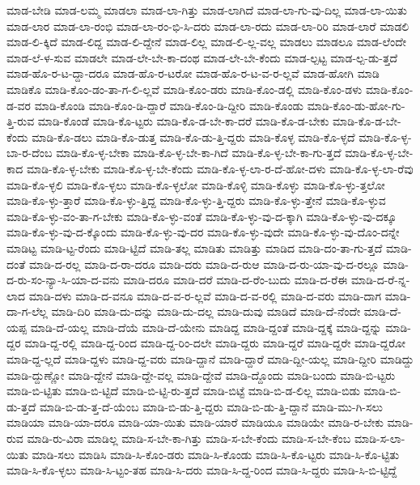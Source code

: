 {ಮಾಡ-ಬೇಡಿ
ಮಾಡ-ಲಮ್ಮ
ಮಾಡಲಾ
ಮಾಡ-ಲಾ-ಗಿತ್ತು
ಮಾಡ-ಲಾಗಿದೆ
ಮಾಡ-ಲಾ-ಗು-ವು-ದಿಲ್ಲ
ಮಾಡ-ಲಾ-ಯಿತು
ಮಾಡ-ಲಾರ
ಮಾಡ-ಲಾ-ರಂಭಿ
ಮಾಡ-ಲಾ-ರಂ-ಭಿ-ಸಿ-ದರು
ಮಾಡ-ಲಾ-ರದು
ಮಾಡ-ಲಾ-ರಿರಿ
ಮಾಡ-ಲಾರೆ
ಮಾಡಲಿ
ಮಾಡ-ಲಿ-ಕ್ಕಿದೆ
ಮಾಡ-ಲಿದ್ದ
ಮಾಡ-ಲಿ-ದ್ದೇನೆ
ಮಾಡ-ಲಿಲ್ಲ
ಮಾಡ-ಲಿ-ಲ್ಲ-ವಲ್ಲ
ಮಾಡಲು
ಮಾಡಲೂ
ಮಾಡ-ಲೆಂದೇ
ಮಾಡ-ಲೆ-ಳ-ಸುವ
ಮಾಡಲೇ
ಮಾಡ-ಲೇ-ಬೇ-ಕಾ-ದಂಥ
ಮಾಡ-ಲೇ-ಬೇ-ಕೆಂದು
ಮಾಡ-ಲ್ಪಟ್ಟ
ಮಾಡ-ಲ್ಪ-ಡು-ತ್ತದೆ
ಮಾಡ-ಹೊ-ರ-ಟ-ದ್ದಾ-ದರೂ
ಮಾಡ-ಹೊ-ರ-ಟರೋ
ಮಾಡ-ಹೊ-ರ-ಟ-ವ-ರ-ಲ್ಲವೆ
ಮಾಡ-ಹೋಗಿ
ಮಾಡಿ
ಮಾಡಿಕೊ
ಮಾಡಿ-ಕೊಂ-ಡಂ-ತಾ-ಗ-ಲಿ-ಲ್ಲವೆ
ಮಾಡಿ-ಕೊಂ-ಡರು
ಮಾಡಿ-ಕೊಂ-ಡಲ್ಲಿ
ಮಾಡಿ-ಕೊಂ-ಡಳು
ಮಾಡಿ-ಕೊಂ-ಡ-ವರ
ಮಾಡಿ-ಕೊಂಡಿ
ಮಾಡಿ-ಕೊಂ-ಡಿ-ದ್ದಾರೆ
ಮಾಡಿ-ಕೊಂ-ಡಿ-ದ್ದೀರಿ
ಮಾಡಿ-ಕೊಂಡು
ಮಾಡಿ-ಕೊಂ-ಡು-ಹೋ-ಗು-ತ್ತಿ-ರುವ
ಮಾಡಿ-ಕೊಂಡೆ
ಮಾಡಿ-ಕೊ-ಟ್ಟರು
ಮಾಡಿ-ಕೊ-ಡ-ಬೇ-ಕಾ-ದರೆ
ಮಾಡಿ-ಕೊ-ಡ-ಬೇಕು
ಮಾಡಿ-ಕೊ-ಡ-ಬೇ-ಕೆಂದು
ಮಾಡಿ-ಕೊ-ಡಲು
ಮಾಡಿ-ಕೊ-ಡುತ್ತ
ಮಾಡಿ-ಕೊ-ಡು-ತ್ತಿ-ದ್ದರು
ಮಾಡಿ-ಕೊಳ್ಳ
ಮಾಡಿ-ಕೊ-ಳ್ಳದೆ
ಮಾಡಿ-ಕೊ-ಳ್ಳ-ಬಾ-ರ-ದೆಂಬ
ಮಾಡಿ-ಕೊ-ಳ್ಳ-ಬೇಕಾ
ಮಾಡಿ-ಕೊ-ಳ್ಳ-ಬೇ-ಕಾ-ಗಿದೆ
ಮಾಡಿ-ಕೊ-ಳ್ಳ-ಬೇ-ಕಾ-ಗು-ತ್ತದೆ
ಮಾಡಿ-ಕೊ-ಳ್ಳ-ಬೇ-ಕಾದ
ಮಾಡಿ-ಕೊ-ಳ್ಳ-ಬೇಕು
ಮಾಡಿ-ಕೊ-ಳ್ಳ-ಬೇ-ಕೆಂದು
ಮಾಡಿ-ಕೊ-ಳ್ಳ-ಲಾ-ರ-ದೆ-ಹೋ-ದಳು
ಮಾಡಿ-ಕೊ-ಳ್ಳ-ಲಾ-ರೆವು
ಮಾಡಿ-ಕೊ-ಳ್ಳಲಿ
ಮಾಡಿ-ಕೊ-ಳ್ಳಲು
ಮಾಡಿ-ಕೊ-ಳ್ಳಲೋ
ಮಾಡಿ-ಕೊಳ್ಳಿ
ಮಾಡಿ-ಕೊಳ್ಳು
ಮಾಡಿ-ಕೊ-ಳ್ಳು-ತ್ತಲೋ
ಮಾಡಿ-ಕೊ-ಳ್ಳು-ತ್ತಾರೆ
ಮಾಡಿ-ಕೊ-ಳ್ಳು-ತ್ತಿದ್ದ
ಮಾಡಿ-ಕೊ-ಳ್ಳು-ತ್ತಿ-ದ್ದರು
ಮಾಡಿ-ಕೊ-ಳ್ಳು-ತ್ತೇನೆ
ಮಾಡಿ-ಕೊ-ಳ್ಳುವ
ಮಾಡಿ-ಕೊ-ಳ್ಳು-ವಂ-ತಾ-ಗ-ಬೇಕು
ಮಾಡಿ-ಕೊ-ಳ್ಳು-ವಂತೆ
ಮಾಡಿ-ಕೊ-ಳ್ಳು-ವು-ದ-ಕ್ಕಾಗಿ
ಮಾಡಿ-ಕೊ-ಳ್ಳು-ವು-ದಕ್ಕೂ
ಮಾಡಿ-ಕೊ-ಳ್ಳು-ವು-ದ-ಕ್ಕೊಂದು
ಮಾಡಿ-ಕೊ-ಳ್ಳು-ವು-ದರ
ಮಾಡಿ-ಕೊ-ಳ್ಳು-ವುದೇ
ಮಾಡಿ-ಕೊ-ಳ್ಳು-ವು-ದೊಂ-ದನ್ನೇ
ಮಾಡಿಟ್ಟ
ಮಾಡಿ-ಟ್ಟ-ರೆಂದು
ಮಾಡಿ-ಟ್ಟಿದೆ
ಮಾಡಿ-ತಲ್ಲ
ಮಾಡಿತು
ಮಾಡಿತ್ತು
ಮಾಡಿದ
ಮಾಡಿ-ದಂ-ತಾ-ಗು-ತ್ತದೆ
ಮಾಡಿ-ದಂತೆ
ಮಾಡಿ-ದ-ರಲ್ಲ
ಮಾಡಿ-ದ-ರಾ-ದರೂ
ಮಾಡಿ-ದರು
ಮಾಡಿ-ದ-ರುಆ
ಮಾಡಿ-ದ-ರು-ಯಾ-ವು-ದ-ರಲ್ಲೂ
ಮಾಡಿ-ದ-ರು-ಸಂ-ನ್ಯಾ-ಸಿ-ಯಾ-ದ-ವನು
ಮಾಡಿ-ದರೂ
ಮಾಡಿ-ದರೆ
ಮಾಡಿ-ದ-ರೆಂ-ಬುದು
ಮಾಡಿ-ದ-ರೆಈ
ಮಾಡಿ-ದ-ರೆ-ನ್ನ-ಲಾದ
ಮಾಡಿ-ದಳು
ಮಾಡಿ-ದ-ವನೂ
ಮಾಡಿ-ದ-ವ-ರ-ಲ್ಲವೆ
ಮಾಡಿ-ದ-ವ-ರಲ್ಲಿ
ಮಾಡಿ-ದ-ವರು
ಮಾಡಿ-ದಾಗ
ಮಾಡಿ-ದಾ-ಗ-ಲೆಲ್ಲ
ಮಾಡಿ-ದಿರಿ
ಮಾಡಿ-ದು-ದನ್ನು
ಮಾಡಿ-ದು-ದಲ್ಲ
ಮಾಡಿ-ದುವು
ಮಾಡಿದೆ
ಮಾಡಿ-ದೆ-ನೆಂದೇ
ಮಾಡಿ-ದೆ-ಯಪ್ಪ
ಮಾಡಿ-ದೆ-ಯಲ್ಲ
ಮಾಡಿ-ದೆಯೆ
ಮಾಡಿ-ದೆ-ಯೇನು
ಮಾಡಿದ್ದ
ಮಾಡಿ-ದ್ದಂತೆ
ಮಾಡಿ-ದ್ದಕ್ಕೆ
ಮಾಡಿ-ದ್ದನ್ನು
ಮಾಡಿ-ದ್ದರ
ಮಾಡಿ-ದ್ದ-ರಲ್ಲಿ
ಮಾಡಿ-ದ್ದ-ರಿಂದ
ಮಾಡಿ-ದ್ದ-ರಿಂ-ದಲೇ
ಮಾಡಿ-ದ್ದರು
ಮಾಡಿ-ದ್ದರೆ
ಮಾಡಿ-ದ್ದರೇ
ಮಾಡಿ-ದ್ದರೋ
ಮಾಡಿ-ದ್ದ-ಲ್ಲದೆ
ಮಾಡಿ-ದ್ದಳು
ಮಾಡಿ-ದ್ದ-ವರು
ಮಾಡಿ-ದ್ದಾನೆ
ಮಾಡಿ-ದ್ದಾರೆ
ಮಾಡಿ-ದ್ದೀ-ಯಲ್ಲ
ಮಾಡಿ-ದ್ದೀರಿ
ಮಾಡಿದ್ದು
ಮಾಡಿ-ದ್ದುಣ್ಣೋ
ಮಾಡಿ-ದ್ದೇನೆ
ಮಾಡಿ-ದ್ದೇ-ವಲ್ಲ
ಮಾಡಿ-ದ್ದೇವೆ
ಮಾಡಿ-ದ್ದೊಂದು
ಮಾಡಿ-ಬಂದು
ಮಾಡಿ-ಬಿ-ಟ್ಟರು
ಮಾಡಿ-ಬಿ-ಟ್ಟಿತು
ಮಾಡಿ-ಬಿ-ಟ್ಟಿದೆ
ಮಾಡಿ-ಬಿ-ಟ್ಟಿ-ರು-ತ್ತದೆ
ಮಾಡಿ-ಬಿಟ್ಟೆ
ಮಾಡಿ-ಬಿ-ಡ-ಲಿಲ್ಲ
ಮಾಡಿ-ಬಿಡು
ಮಾಡಿ-ಬಿ-ಡು-ತ್ತದೆ
ಮಾಡಿ-ಬಿ-ಡು-ತ್ತ-ದೆ-ಯೆಂಬ
ಮಾಡಿ-ಬಿ-ಡು-ತ್ತಿ-ದ್ದರು
ಮಾಡಿ-ಬಿ-ಡು-ತ್ತಿ-ದ್ದಾನೆ
ಮಾಡಿ-ಮು-ಗಿ-ಸಲು
ಮಾಡಿಯಾ
ಮಾಡಿ-ಯಾ-ದರೂ
ಮಾಡಿ-ಯಾ-ಯಿತು
ಮಾಡಿ-ಯಾರೆ
ಮಾಡಿಯೂ
ಮಾಡಿಯೇ
ಮಾಡಿ-ರ-ಬೇಕು
ಮಾಡಿ-ರುವ
ಮಾಡಿ-ರು-ವಿರಾ
ಮಾಡಿಲ್ಲ
ಮಾಡಿ-ಸ-ಬೇ-ಕಾ-ಗಿತ್ತು
ಮಾಡಿ-ಸ-ಬೇ-ಕೆಂದು
ಮಾಡಿ-ಸ-ಬೇ-ಕೆಂಬ
ಮಾಡಿ-ಸ-ಲಾ-ಯಿತು
ಮಾಡಿ-ಸಲು
ಮಾಡಿಸಿ
ಮಾಡಿ-ಸಿ-ಕೊಂ-ಡರು
ಮಾಡಿ-ಸಿ-ಕೊಂಡು
ಮಾಡಿ-ಸಿ-ಕೊ-ಟ್ಟರು
ಮಾಡಿ-ಸಿ-ಕೊ-ಟ್ಟಿತು
ಮಾಡಿ-ಸಿ-ಕೊ-ಳ್ಳಲು
ಮಾಡಿ-ಸಿ-ಟ್ಟಂ-ತಹ
ಮಾಡಿ-ಸಿ-ದರು
ಮಾಡಿ-ಸಿ-ದ್ದ-ರಿಂದ
ಮಾಡಿ-ಸಿ-ದ್ದರು
ಮಾಡಿ-ಸಿ-ಬಿ-ಟ್ಟಿದ್ದೆ
}
